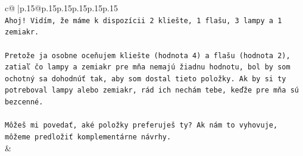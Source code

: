 \documentclass{article}
\begin{document}
{\begin{supertabular}{c@{$\;$}|p{.15\linewidth}@{}p{.15\linewidth}p{.15\linewidth}p{.15\linewidth}p{.15\linewidth}p{.15\linewidth}}
{{{\\ 
\texttt{Ahoj! Vidím, že máme k dispozícii 2 kliešte, 1 flašu, 3 lampy a 1 zemiakr.} \\
\\ 
\texttt{Pretože ja osobne oceňujem kliešte (hodnota 4) a flašu (hodnota 2), zatiaľ čo lampy a zemiakr pre mňa nemajú žiadnu hodnotu, bol by som ochotný sa dohodnúť tak, aby som dostal tieto položky. Ak by si ty potreboval lampy alebo zemiakr, rád ich nechám tebe, keďže pre mňa sú bezcenné.} \\
\\ 
\texttt{Môžeš mi povedať, aké položky preferuješ ty? Ak nám to vyhovuje, môžeme predložiť komplementárne návrhy.} \\
            }
        }
    }
    & \\ \\


\end{supertabular}}
\end{document}
